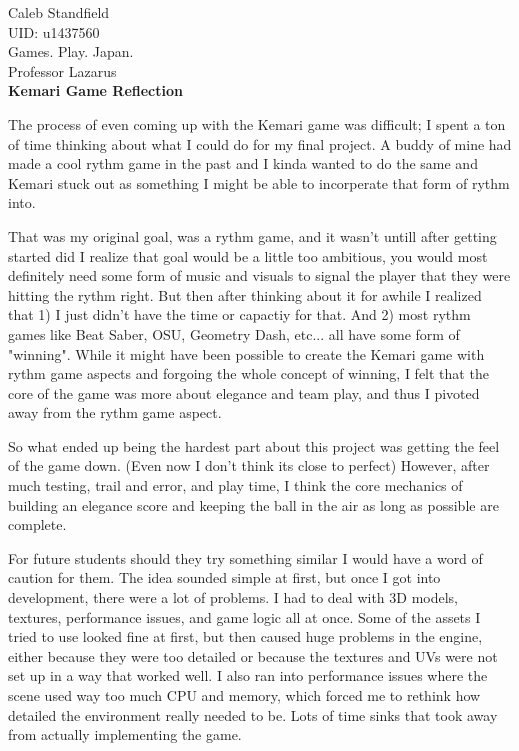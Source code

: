 \documentclass[12pt]{article}
\begin{document}
\begin{center}
    \hfill Caleb Standfield\\
    \hfill UID: u1437560\\
    \hfill Games. Play. Japan.\\
    \hfill Professor Lazarus \\ \vspace{4mm}
    {\LARGE \textbf{Kemari Game Reflection}}\\[1em]
\end{center}

\vspace{1em}

The process of even coming up with the Kemari game was difficult; I spent a ton of time thinking about what I could do for my final project. A buddy of mine had made a cool rythm game in the past and I kinda wanted to do the same and Kemari stuck out as something I might be able to incorperate that form of rythm into.

That was my original goal, was a rythm game, and it wasn't untill after getting started did I realize that goal would be a little too ambitious, you would most definitely need some form of music and visuals to signal the player that they were hitting the rythm right. But then after thinking about it for awhile I realized that 1) I just didn't have the time or capactiy for that. And 2) most rythm games like Beat Saber, OSU, Geometry Dash, etc... all have some form of "winning". While it might have been possible to create the Kemari game with rythm game aspects and forgoing the whole concept of winning, I felt that the core of the game was more about elegance and team play, and thus I pivoted away from the rythm game aspect.

So what ended up being the hardest part about this project was getting the feel of the game down. (Even now I don't think its close to perfect) However, after much testing, trail and error, and play time, I think the core mechanics of building an elegance score and keeping the ball in the air as long as possible are complete.

For future students should they try something similar I would have a word of caution for them. The idea sounded simple at first, but once I got into development, there were a lot of problems. I had to deal with 3D models, textures, performance issues, and game logic all at once. Some of the assets I tried to use looked fine at first, but then caused huge problems in the engine, either because they were too detailed or because the textures and UVs were not set up in a way that worked well. I also ran into performance issues where the scene used way too much CPU and memory, which forced me to rethink how detailed the environment really needed to be. Lots of time sinks that took away from actually implementing the game.
\end{document}
